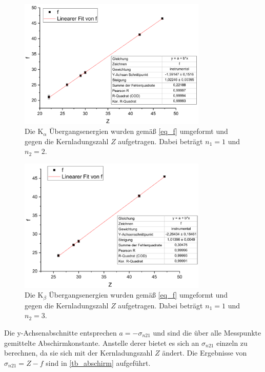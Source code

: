 \documentclass[
	a4paper,
	12pt,
	pagesize,
	ngerman
]{scrartcl}
\begin{document}
	\begin{figure}[H]
		\includegraphics[width=0.8\textwidth]{Ka}
		\centering
		\caption{Die $\text{K}_\alpha$ Übergangsenergien wurden gemäß \cref{eq_f} umgeformt und gegen die Kernladungszahl $Z$ aufgetragen. Dabei beträgt $n_1=1$ und $n_2=2$.}
		\label{fig_Ka}
		\centering
	\end{figure}
	
	\begin{figure}[H]
		\includegraphics[width=0.8\textwidth]{Kb}
		\centering
		\caption{Die $\text{K}_\beta$ Übergangsenergien wurden gemäß \cref{eq_f} umgeformt und gegen die Kernladungszahl $Z$ aufgetragen. Dabei beträgt $n_1=1$ und $n_2=3$.}
			\label{fig_Kb}
			\centering
	\end{figure}
	
	Die y-Achsenabschnitte entsprechen $a=-\sigma_{n21}$ und sind die über alle Messpunkte gemittelte Abschirmkonstante.
	Anstelle derer bietet es sich an $\sigma_{n21}$ einzeln zu berechnen, da sie sich mit der Kernladungszahl $Z$ ändert.
	Die Ergebnisse von $\sigma_{n21}=Z-f$ sind in \cref{tb_abschirm} aufgeführt.
	
\end{document}
